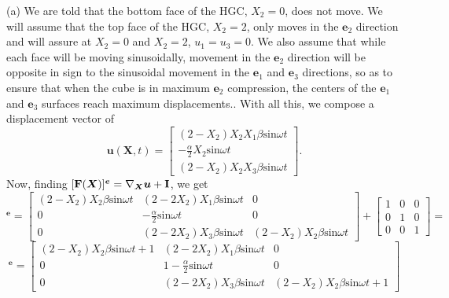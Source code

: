 (a) We are told that the bottom face of the HGC, $X_2=0$, does not move. We will assume that the top face of the HGC, $X_2=2$, only moves in the $\bm{e}_2$ direction and will assure at $X_2=0$ and $X_2=2$, $u_1=u_3=0$. We also assume that while each face will be moving sinusoidally, movement in the $\bm{e}_2$ direction will be opposite in sign  to the sinusoidal movement in the $\bm{e}_1$ and $\bm{e}_3$ directions, so as to ensure that when the cube is in maximum $\bm{e}_2$ compression, the centers of the $\bm{e}_1$ and $\bm{e}_3$ surfaces reach maximum displacements.. With all this, we compose a displacement vector of
\begin{equation*}
    \bm{u}(\bm{X},t)=\begin{bmatrix}
        (2-X_2)X_2X_1\beta\text{sin}\omega t\\ -\frac{\alpha}{2}X_2\text{sin}\omega t \\(2-X_2)X_2X_3\beta\text{sin}\omega t
    \end{bmatrix}.
\end{equation*}
Now, finding $[\mathbf{F}(\bm{X})]^{\bm{e}}=\nabla_{\bm{X}}\bm{u}+\mathbf{I}$, we get
\begin{equation*}
    [\bn{F}(\bm{X})]^{\bm{e}}=\begin{bmatrix}
        (2-X_2)X_2\beta\text{sin}\omega t& (2-2X_2)X_1\beta\text{sin}\omega t& 0\\ 0& -\frac{\alpha}{2}\text{sin}\omega t&0 \\0 & (2-2X_2)X_3\beta\text{sin}\omega t&(2-X_2)X_2\beta\text{sin}\omega t 
    \end{bmatrix}+\begin{bmatrix} 1& 0& 0\\ 0& 1& 0\\ 0& 0& 1\end{bmatrix}=
\end{equation*}
\begin{equation*}
    [\bn{F}(\bm{X})]^{\bm{e}}=\begin{bmatrix}
        (2-X_2)X_2\beta\text{sin}\omega t+1& (2-2X_2)X_1\beta\text{sin}\omega t& 0\\ 0& 1-\frac{\alpha}{2}\text{sin}\omega t&0 \\0 & (2-2X_2)X_3\beta\text{sin}\omega t&(2-X_2)X_2\beta\text{sin}\omega t+1 
    \end{bmatrix}
\end{equation*}

